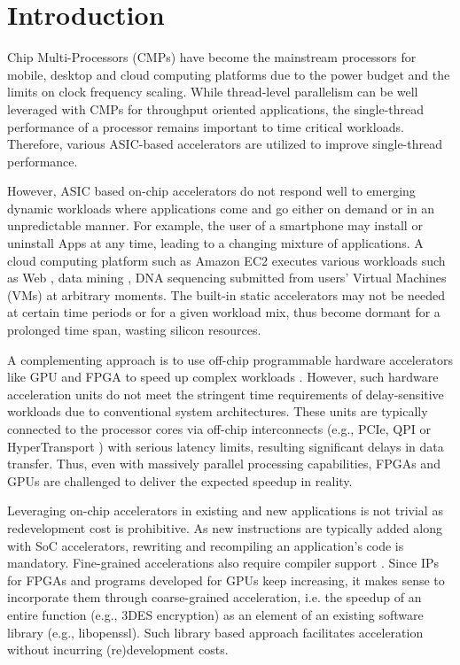 
\section{Introduction}


Chip Multi-Processors (CMPs) have become the mainstream processors for
mobile, desktop and cloud computing platforms due to the power
budget and the limits on clock frequency scaling. While
thread-level parallelism can be well leveraged with CMPs \cite{CMP05}
for throughput oriented applications, the single-thread performance of
a processor remains important to time critical workloads. Therefore,
various ASIC-based accelerators are utilized to improve single-thread performance. 

However, ASIC based on-chip accelerators do not respond well to
emerging dynamic workloads where applications come and go either on
demand or in an unpredictable manner. For example, the user of a smartphone may
install or uninstall Apps at any time, leading to a changing mixture
of applications. A cloud computing platform such as Amazon EC2
\cite{amazon-ec2} executes various workloads such as Web
\cite{Chen:2012jo}, data mining \cite{ec2-datamining}, DNA sequencing
\cite{ec2-dna} submitted from users' Virtual Machines (VMs) at
arbitrary moments. The built-in static accelerators may not be needed at certain time periods
or for a given workload mix, thus
become dormant for a prolonged time span, wasting silicon resources.

A complementing approach is to use off-chip programmable hardware
accelerators like GPU and FPGA to speed up complex workloads
\cite{GPUFPGA, fpga-acc}. However, such hardware acceleration units do
not meet the stringent time requirements of delay-sensitive workloads
due to conventional system architectures. These units are typically
connected to the processor cores via off-chip interconnects
(e.g., PCIe, QPI \cite{intel-qpi} or HyperTransport
\cite{amd-hypertransport}) with serious latency limits, resulting
significant delays in data transfer. Thus, even with massively
parallel processing capabilities, FPGAs and GPUs are challenged to
deliver the expected speedup in reality.  

Leveraging on-chip accelerators in existing and new applications is
not trivial as redevelopment cost is prohibitive.  
As new instructions are typically added along with SoC
accelerators, rewriting and recompiling an application's code is
mandatory. Fine-grained accelerations also require compiler support \cite{Govindaraju:2012fn}. Since IPs for
FPGAs and programs developed for GPUs keep increasing, it makes sense
to incorporate them through coarse-grained acceleration, i.e. the
speedup of an entire function (e.g., 3DES encryption) as an element of
an existing software library (e.g., libopenssl). Such library based
approach facilitates acceleration without incurring (re)development
costs. 

